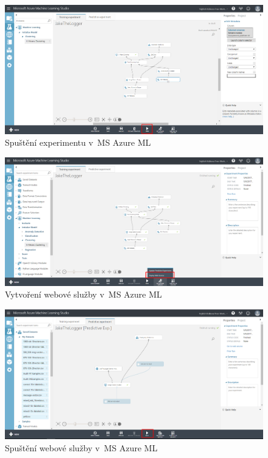 \documentclass[thesis=M,czech]{FITthesis}[2012/10/20]
\newcommand{\tmpframe}[1]{\fbox{#1}}
\renewcommand{\tmpframe}[1]{#1}
\begin{document}
	\begin{figure}[htb]\centering
		\tmpframe{\includegraphics[width=\textwidth]{./img/azure/experiment04}}	
		\caption{Spuštění experimentu v~MS Azure ML}
		\label{fig:azure-experiment04}
	\end{figure}
	\begin{figure}[htb]\centering
		\tmpframe{\includegraphics[width=\textwidth]{./img/azure/experiment05}}	
		\caption{Vytvoření webové služby v~MS Azure ML}
		\label{fig:azure-experiment05}
	\end{figure}
	\begin{figure}[htb]\centering
		\tmpframe{\includegraphics[width=\textwidth]{./img/azure/experiment06}}	
		\caption{Spuštění webové služby v~MS Azure ML}
		\label{fig:azure-experiment06}
	\end{figure}
\end{document}
